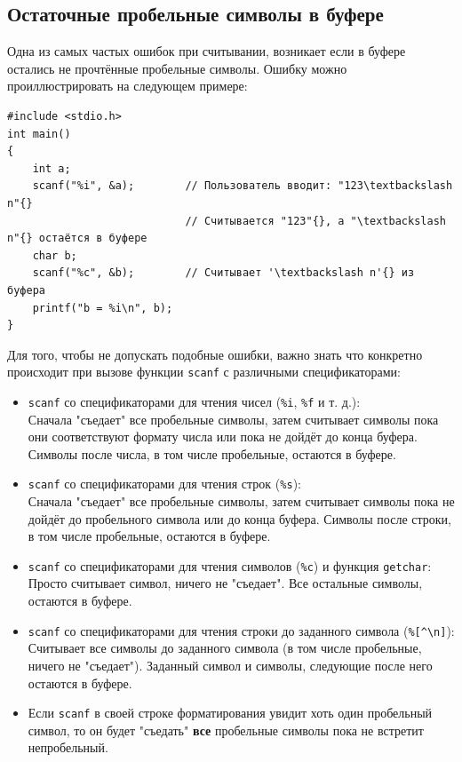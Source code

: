 \documentclass[10pt]{article}
\begin{document}
\subsection*{Остаточные пробельные символы в буфере}
Одна из самых частых ошибок при считывании, возникает если в буфере остались не прочтённые пробельные символы. Ошибку можно проиллюстрировать на следующем примере:
\begin{lstlisting}
#include <stdio.h>
int main()
{
    int a;
    scanf("%i", &a);		// Пользователь вводит: "123\textbackslash n"{}
    						// Считывается "123"{}, а "\textbackslash n"{} остаётся в буфере 
    char b;
    scanf("%c", &b);		// Считывает '\textbackslash n'{} из буфера
    printf("b = %i\n", b);
}
\end{lstlisting}
Для того, чтобы не допускать подобные ошибки, важно знать что конкретно происходит при вызове функции \texttt{scanf} с различными спецификаторами:
\begin{itemize}
\item \texttt{scanf} со спецификаторами для чтения чисел (\texttt{\%i}, \texttt{\%f} и т. д.):\\
Сначала "съедает"{} все пробельные символы, затем считывает символы пока они соответствуют формату числа или пока не дойдёт до конца буфера. Символы после числа, в том числе пробельные, остаются в буфере.

\item \texttt{scanf} со спецификаторами для чтения строк (\texttt{\%s}):\\
Сначала "съедает"{} все пробельные символы, затем считывает символы пока не дойдёт до пробельного символа или  до конца буфера. Символы после строки, в том числе пробельные, остаются в буфере.

\item \texttt{scanf} со спецификаторами для чтения символов (\texttt{\%c}) и функция \texttt{getchar}:\\
Просто считывает символ, ничего не "съедает"{}. Все остальные символы, остаются в буфере.

\item \texttt{scanf} со спецификаторами для чтения строки до заданного символа (\texttt{\%[\textasciicircum \textbackslash n]}):\\
Считывает все символы до заданного символа (в том числе пробельные, ничего не "съедает"{}). Заданный символ и символы, следующие после него остаются в буфере. 

\item Если \texttt{scanf} в своей строке форматирования увидит хоть один пробельный символ, то он будет "съедать"{} \textbf{все} пробельные символы пока не встретит непробельный.
\end{itemize}
\end{document}
